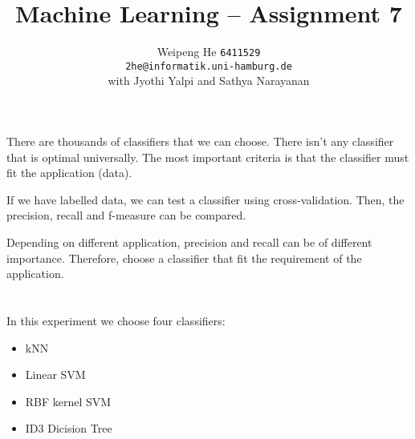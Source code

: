 \documentclass{article}[11pt]
\title{Machine Learning -- Assignment 7}
\author{Weipeng He \texttt{6411529} \\ \texttt{2he@informatik.uni-hamburg.de}  \\ with Jyothi Yalpi and Sathya Narayanan}
\begin{document}
\maketitle

\section{}
There are thousands of classifiers that we can choose. There isn't any classifier that is optimal universally.
The most important criteria is that the classifier must fit the application (data).

If we have labelled data, we can test a classifier using cross-validation.
Then, the precision, recall and f-measure can be compared.

Depending on different application, precision and recall can be of different importance. Therefore, choose a classifier that fit the requirement of the application.

\section{}
\subsection{}
In this experiment we choose four classifiers:
\begin{itemize}
  \item kNN
  \item Linear SVM
  \item RBF kernel SVM
  \item ID3 Dicision Tree
\end{itemize}

\subsection{}
\end{document}
